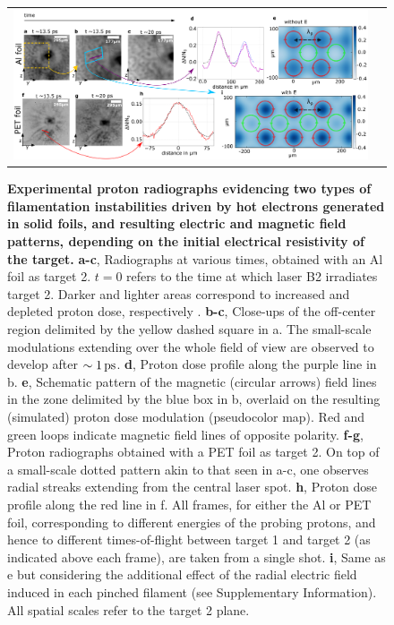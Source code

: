\documentclass[aps,twocolumn,showpacs,superscriptaddress]{revtex4}
\begin{document}
\begin{figure}[tbh!]
\begin{tabular}{cc}
\includegraphics[scale = 0.6]{panel_v7_woE.png}
\end{tabular}
 \caption{
\textbf{Experimental proton radiographs evidencing two types of filamentation instabilities driven by hot electrons generated in solid foils, and resulting electric and magnetic field patterns, depending on the initial electrical resistivity of the target.}
\textbf{a-c}, Radiographs at various times, obtained with an Al foil as target 2. $t=0$ refers to the time at which laser B2 irradiates target 2. Darker and lighter areas correspond to increased and depleted proton dose, respectively \cite{RSI_Albertazzi_2015}. 
\textbf{b-c}, Close-ups of the off-center region delimited by the yellow dashed square in a. The small-scale modulations extending over the whole field of view are observed to develop after $\sim 1\,\rm ps$.
\textbf{d}, Proton dose profile along the purple line in b.
\textbf{e}, Schematic pattern of the magnetic (circular arrows) field lines in the zone delimited by the blue box in b, overlaid on the resulting (simulated) proton dose modulation (pseudocolor map). Red and green loops indicate magnetic field lines of opposite polarity.
\textbf{f-g}, Proton radiographs obtained with a PET foil as target 2. 
On top of a small-scale dotted pattern akin to that seen in a-c, one observes radial streaks extending from the central laser spot. 
\textbf{h}, Proton dose profile along the red line in f.
All frames, for either the Al or PET foil, corresponding to different energies of the probing protons, and hence to different times-of-flight between target 1 and target 2 (as indicated above each frame), are taken from a single shot.
\textbf{i}, Same as e but considering the additional effect of the radial electric field induced in each pinched filament (see Supplementary Information).
All spatial scales refer to the target 2 plane.}
\label{fig:radio}
\end{figure}
\end{document}
